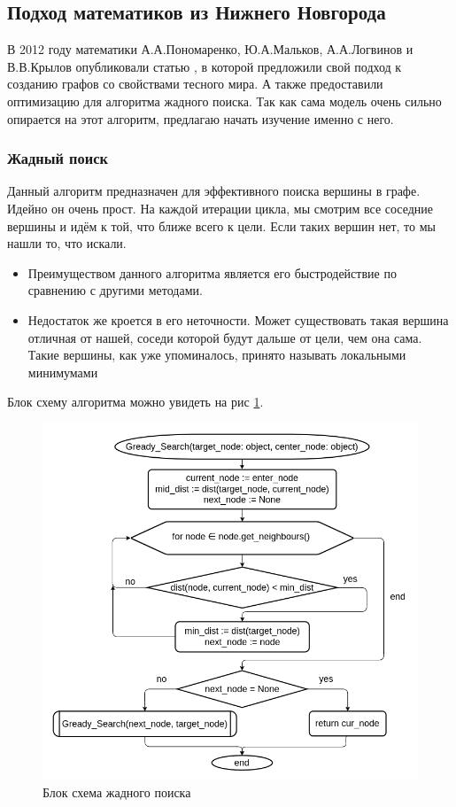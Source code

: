 \subsection{Подход математиков из Нижнего Новгорода}

В 2012 году математики А.А.Пономаренко, Ю.А.Мальков, А.А.Логвинов и В.В.Кры\-лов
опубликовали статью \cite{Ponomarenko} , в которой предложили свой подход к созданию графов со свойствами 
тесного мира. А также предоставили оптимизацию для алгоритма жадного поиска. Так как сама модель
очень сильно опирается на этот алгоритм, предлагаю начать изучение именно с него.

\subsubsection{Жадный поиск}
Данный алгоритм предназначен для эффективного поиска вершины в графе. Идейно он очень прост.
На каждой итерации цикла, мы смотрим все соседние вершины и идём к той, что ближе всего к цели.
Если таких вершин нет, то мы нашли то, что искали.

\begin{itemize}
    \item Преимуществом данного алгоритма является его быстродействие по сравнению с другими методами. 
    \item Недостаток же кроется в его неточности. Может существовать такая вершина от\-личная
    от нашей, соседи которой будут дальше от цели, чем она сама. Такие вер\-шины, как уже упоминалось,
    принято называть локальными минимумами 
\end{itemize}

Блок схему алгоритма можно увидеть на рис \ref{grady_search_block_scheme}. 

\begin{figure}[H]
    \centering
    \includegraphics[scale=0.6]{./pictures/Gready_Search.png}
    \caption{Блок схема жадного поиска} \label{grady_search_block_scheme}
\end{figure}

